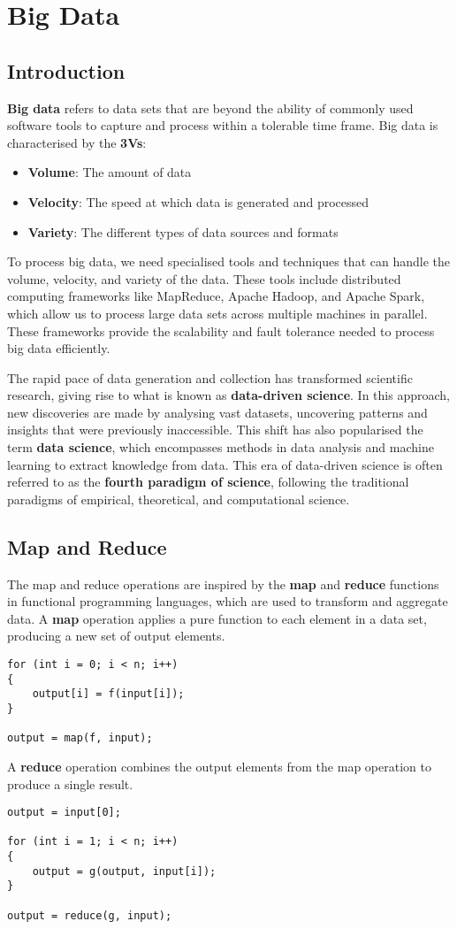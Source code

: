 \documentclass{article}
\newenvironment{aside}[1][]
  {\begin{mdframed}[style=0,%
      leftline=false,rightline=false,leftmargin=2em,rightmargin=2em,%
          innerleftmargin=0pt,innerrightmargin=0pt,linewidth=0.75pt,%
      skipabove=7pt,skipbelow=7pt,#1]\small}
  {\end{mdframed}}
\begin{document}
\section{Big Data}
\subsection{Introduction}
\textbf{Big data} refers to data sets that are beyond the ability of
commonly used software tools to capture and process within a tolerable
time frame. Big data is characterised by the \textbf{3Vs}:
\begin{itemize}
    \item \textbf{Volume}: The amount of data
    \item \textbf{Velocity}: The speed at which data is generated and
          processed
    \item \textbf{Variety}: The different types of data sources and
          formats
\end{itemize}
To process big data, we need specialised tools and techniques that can
handle the volume, velocity, and variety of the data. These tools
include distributed computing frameworks like MapReduce, Apache Hadoop,
and Apache Spark, which allow us to process large data sets across
multiple machines in parallel. These frameworks provide the scalability
and fault tolerance needed to process big data efficiently.
\begin{aside}
    The rapid pace of data generation and collection has transformed
    scientific research, giving rise to what is known as
    \textbf{data-driven science}. In this approach, new discoveries are
    made by analysing vast datasets, uncovering patterns and insights
    that were previously inaccessible. This shift has also popularised
    the term \textbf{data science}, which encompasses methods in data
    analysis and machine learning to extract knowledge from data.
    This era of data-driven science is often referred to as the
    \textbf{fourth paradigm of science}, following the traditional
    paradigms of empirical, theoretical, and computational science.
\end{aside}
\subsection{Map and Reduce}
The map and reduce operations are inspired by the \textbf{map} and
\textbf{reduce} functions in functional programming languages, which
are used to transform and aggregate data. A \textbf{map} operation
applies a pure function to each element in a data set, producing a new
set of output elements.
\begin{verbatim}
for (int i = 0; i < n; i++)
{
    output[i] = f(input[i]);
}

output = map(f, input);
\end{verbatim}
A \textbf{reduce} operation combines the output elements from the map
operation to produce a single result.
\begin{verbatim}
output = input[0];

for (int i = 1; i < n; i++)
{
    output = g(output, input[i]);
}

output = reduce(g, input);
\end{verbatim}
\end{document}
